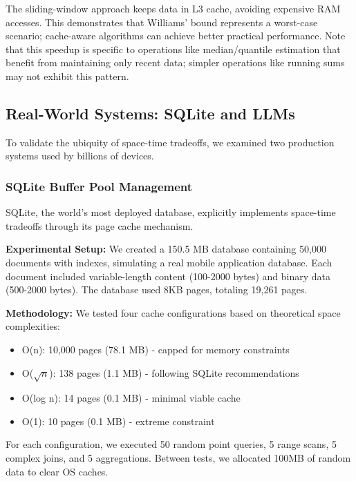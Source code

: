 \documentclass[11pt]{article}
\theoremstyle{definition}
\begin{document}
The sliding-window approach keeps data in L3 cache, avoiding expensive RAM accesses. This demonstrates that Williams' bound represents a worst-case scenario; cache-aware algorithms can achieve better practical performance. Note that this speedup is specific to operations like median/quantile estimation that benefit from maintaining only recent data; simpler operations like running sums may not exhibit this pattern.

\subsection{Real-World Systems: SQLite and LLMs}

To validate the ubiquity of space-time tradeoffs, we examined two production systems used by billions of devices.

\subsubsection{SQLite Buffer Pool Management}

SQLite, the world's most deployed database, explicitly implements space-time tradeoffs through its page cache mechanism.

\textbf{Experimental Setup:} We created a 150.5 MB database containing 50,000 documents with indexes, simulating a real mobile application database. Each document included variable-length content (100-2000 bytes) and binary data (500-2000 bytes). The database used 8KB pages, totaling 19,261 pages.

\textbf{Methodology:} We tested four cache configurations based on theoretical space complexities:
\begin{itemize}
\item O(n): 10,000 pages (78.1 MB) - capped for memory constraints
\item O($\sqrt{n}$): 138 pages (1.1 MB) - following SQLite recommendations  
\item O(log n): 14 pages (0.1 MB) - minimal viable cache
\item O(1): 10 pages (0.1 MB) - extreme constraint
\end{itemize}

For each configuration, we executed 50 random point queries, 5 range scans, 5 complex joins, and 5 aggregations. Between tests, we allocated 100MB of random data to clear OS caches.
\end{document}

